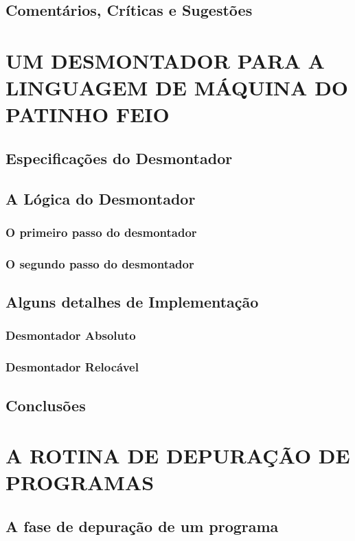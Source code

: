 \documentclass[a4paper,12pt]{article}
\begin{document}
\subsection{Comentários, Críticas e Sugestões}

\section{UM DESMONTADOR PARA A LINGUAGEM DE MÁQUINA DO PATINHO FEIO}
\subsection{Especificações do Desmontador}

\subsection{A Lógica do Desmontador}
\subsubsection{O primeiro passo do desmontador}
\subsubsection{O segundo passo do desmontador}

\subsection{Alguns detalhes de Implementação}
\subsubsection{Desmontador Absoluto}
\subsubsection{Desmontador Relocável}

\subsection{Conclusões}

\section{A ROTINA DE DEPURAÇÃO DE PROGRAMAS}
\subsection{A fase de depuração de um programa}
\end{document}
